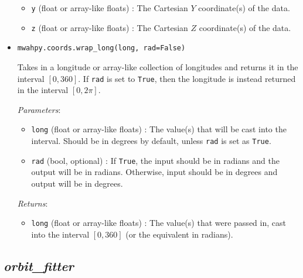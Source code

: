\documentclass{article}
\begin{document}
\begin{itemize}
\begin{itemize}
\item \verb!y! (float or array-like floats) : The Cartesian $Y$ coordinate(s) of the data.

\item \verb!z! (float or array-like floats) : The Cartesian $Z$ coordinate(s) of the data.

\end{itemize}



\item \verb!mwahpy.coords.wrap_long(long, rad=False)!

Takes in a longitude or array-like collection of longitudes and returns it in the interval $[0, 360]$. If \verb!rad! is set to \verb!True!, then the longitude is instead returned in the interval $[0, 2\pi]$. 

\textit{Parameters}: \begin{itemize}

\item \verb!long! (float or array-like floats) : The value(s) that will be cast into the interval. Should be in degrees by default, unless \verb!rad! is set as \verb!True!.

\item \verb!rad! (bool, optional) : If \verb!True!, the input should be in radians and the output will be in radians. Otherwise, input should be in degrees and output will be in degrees.

\end{itemize}

\textit{Returns}: \begin{itemize}

\item \verb!long! (float or array-like floats) : The value(s) that were passed in, cast into the interval $[0,360]$ (or the equivalent in radians).

\end{itemize}




\end{itemize}



\subsection{\textit{orbit\_fitter}}
\end{document}
